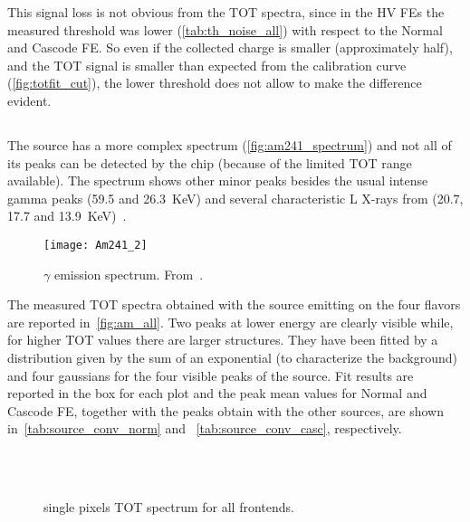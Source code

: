 This signal loss is not obvious from the TOT spectra, since in the HV FEs the measured threshold was lower (\autoref{tab:th_noise_all}) with respect to the Normal and Cascode FE. So even if the collected charge is smaller (approximately half), and the TOT signal is smaller than expected from the calibration curve (\autoref{fig:totfit_cut}), the lower threshold does not allow to make the difference evident.

\subsection{}


The  source has a more complex spectrum (\autoref{fig:am241_spectrum}) and not all of its peaks can be detected by the chip (because of the limited TOT range available). The spectrum shows other minor peaks besides the usual intense gamma peaks (59.5 and \SI{26.3}{KeV}) and several characteristic L X-rays from  (20.7, 17.7 and \SI{13.9}{KeV})~\cite{terada2016measurements}.\\ 

\begin{figure}[h!]
\centering
\texttt{[image: Am241\_2]}
\caption{ $\gamma$ emission spectrum. From~\cite{terada2016measurements}.}
\label{fig:am241_spectrum}
\end{figure}

The measured TOT spectra obtained with the  source emitting on the four flavors are reported in~\autoref{fig:am_all}. Two peaks at lower energy are clearly visible while, for higher TOT values there are larger structures. They have been fitted by a distribution given by the sum of an exponential (to characterize the background) and four gaussians for the four visible peaks of the source. Fit results are reported in the box for each plot and the peak mean values for Normal and Cascode FE, together with the peaks obtain with the other sources, are shown in~\autoref{tab:source_conv_norm} and ~\autoref{tab:source_conv_casc}, respectively.

\begin{figure}[h!]
\centering
{}\quad
{}\\
\quad
{}\\
\caption{ single pixels TOT spectrum for all frontends.}
\label{fig:am_all}
\end{figure}


